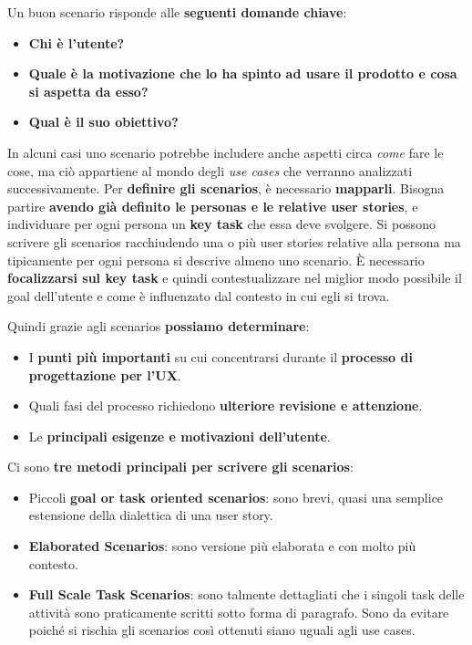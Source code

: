 Un buon scenario risponde alle \textbf{seguenti domande chiave}:

\begin{itemize}
	\item \textbf{Chi è l'utente?}
	\item \textbf{Quale è la motivazione che lo ha spinto ad usare il prodotto e cosa si aspetta da esso?}
	\item \textbf{Qual è il suo obiettivo?}
\end{itemize}

In alcuni casi uno scenario potrebbe includere anche aspetti circa \textit{come} fare le cose, ma ciò appartiene al mondo degli \textit{use cases} che verranno analizzati successivamente.
Per \textbf{definire gli scenarios}, è necessario \textbf{mapparli}. Bisogna partire \textbf{avendo già definito le personas e le relative user stories}, e individuare per ogni persona un \textbf{key task} che essa deve svolgere. Si possono scrivere gli scenarios racchiudendo una o più
user stories relative alla persona ma tipicamente per ogni persona si descrive  almeno uno scenario. È necessario \textbf{focalizzarsi sul key task} e quindi contestualizzare nel miglior modo possibile il goal dell'utente e come è influenzato dal contesto in cui egli si trova.

Quindi grazie agli scenarios \textbf{possiamo determinare}:

\begin{itemize}
	\item I \textbf{punti più importanti} su cui concentrarsi durante il \textbf{processo di progettazione per l'UX}.
	\item Quali fasi del processo richiedono \textbf{ulteriore revisione e attenzione}.
	\item Le \textbf{principali esigenze e motivazioni dell'utente}.
\end{itemize}


Ci sono \textbf{tre metodi principali per scrivere gli scenarios}:

\begin{itemize}
	\item Piccoli \textbf{goal or task oriented scenarios}: sono brevi, quasi una semplice estensione della dialettica di una user story.
	\item \textbf{Elaborated Scenarios}: sono versione più elaborata e con molto più contesto.
	\item \textbf{Full Scale Task Scenarios}: sono talmente dettagliati che i singoli task delle attività sono praticamente scritti sotto forma di paragrafo. Sono da evitare poiché si rischia gli scenarios così ottenuti siano uguali agli use cases.
\end{itemize}

